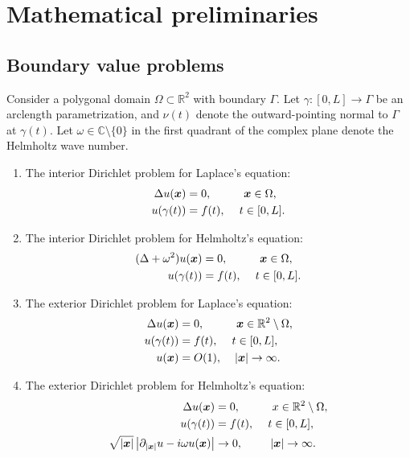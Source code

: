 \section{Mathematical preliminaries}
\subsection{Boundary value problems}
Consider a polygonal domain $\Omega \subset \mathbb{R}^2$ with boundary $\Gamma.$ 
Let $\gamma:[0,L] \to \Gamma$ be an arclength parametrization, and $\nu(t)$ denote the 
outward-pointing normal to $\Gamma$ at $\gamma(t).$  
Let $\omega \in \mathbb{C} \setminus \{ 0 \}$ in the first quadrant of the complex plane denote the 
Helmholtz wave number.
\begin{enumerate}
\item The interior Dirichlet problem for Laplace's equation:
\begin{align}\label{eqn:BVPIDL}
\Delta u(\boldsymbol{x}) &= 0, \hspace{1 cm} \boldsymbol{x} \in \Omega,\\
u(\gamma(t)) &= f(t), \hspace{0.43 cm} t \in [0,L].
\end{align}

\item The interior Dirichlet problem for Helmholtz's equation:
\begin{align}\label{eqn:BVPIDH}
(\Delta + \omega^2) u(\boldsymbol{x}) &= 0, \hspace{1 cm} \boldsymbol{x} \in \Omega,\\
u(\gamma(t)) &= f(t), \hspace{0.43 cm} t \in [0,L].
\end{align}


\item The exterior Dirichlet problem for Laplace's equation:
\begin{align}\label{eqn:BVPEDL}
\Delta u(\boldsymbol{x}) &= 0, \hspace{1 cm} \boldsymbol{x} \in \mathbb{R}^2\setminus\Omega,\\
u(\gamma(t)) &= f(t), \hspace{0.43 cm} t \in[0,L], \\
u(\boldsymbol{x}) &= O(1) , \hspace{0.4cm} |\boldsymbol{x}| \to \infty.
\end{align}

\item The exterior Dirichlet problem for Helmholtz's equation:
\begin{align}\label{eqn:BVPEDH}
\Delta u(\boldsymbol{x}) &= 0, \hspace{1 cm} x \in \mathbb{R}^2\setminus\Omega,\\
u(\gamma(t)) &= f(t), \hspace{0.43 cm} t \in[0,L], \\
\sqrt{|\boldsymbol{x}|} \left|\partial_{|\boldsymbol{x}|} u - i\omega u(\boldsymbol{x})\right| &\to 0 , \hspace{0.86cm} |\boldsymbol{x}| \to \infty.
\end{align}


\end{enumerate}
